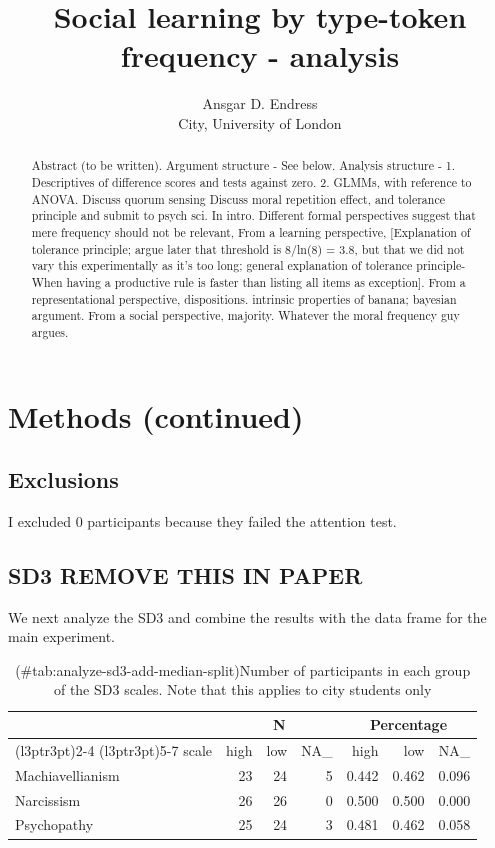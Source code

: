 \documentclass[
]{article}
\title{Social learning by type-token frequency - analysis}
\author{Ansgar D. Endress\\
City, University of London}
\date{}
\begin{document}
\maketitle
\begin{abstract}
Abstract (to be written). Argument structure - See below. Analysis structure - 1. Descriptives of difference scores and tests against zero. 2. GLMMs, with reference to ANOVA. Discuss quorum sensing \citep{Sumpter2009} Discuss moral repetition effect, and tolerance principle and submit to psych sci. In intro. Different formal perspectives suggest that mere frequency should not be relevant, From a learning perspective, {[}Explanation of tolerance principle; argue later that threshold is 8/ln(8) = 3.8, but that we did not vary this experimentally as it's too long; general explanation of tolerance principle- When having a productive rule is faster than listing all items as exception{]}. From a representational perspective, dispositions. intrinsic properties of banana; bayesian argument. From a social perspective, majority. Whatever the moral frequency guy argues.
\end{abstract}

\section{Methods (continued)}\label{methods-continued}

\subsection{Exclusions}\label{exclusions}

I excluded 0 participants because they failed the attention test.

\subsection{SD3 REMOVE THIS IN PAPER}\label{sd3-remove-this-in-paper}

We next analyze the SD3 and combine the results with the data frame for the main experiment.

\begin{table}
\centering
\caption{(\#tab:analyze-sd3-add-median-split)Number of participants in each group of the SD3 scales. Note that this applies to city students only}
\centering
\begin{tabular}[t]{lrrrrrr}
\toprule
\multicolumn{1}{c}{\textbf{ }} & \multicolumn{3}{c}{\textbf{N}} & \multicolumn{3}{c}{\textbf{Percentage}} \\
\cmidrule(l{3pt}r{3pt}){2-4} \cmidrule(l{3pt}r{3pt}){5-7}
scale & high & low & NA\_ & high & low & NA\_\\
\midrule
Machiavellianism & 23 & 24 & 5 & 0.442 & 0.462 & 0.096\\
Narcissism & 26 & 26 & 0 & 0.500 & 0.500 & 0.000\\
Psychopathy & 25 & 24 & 3 & 0.481 & 0.462 & 0.058\\
\bottomrule
\end{tabular}
\end{table}
\end{document}
